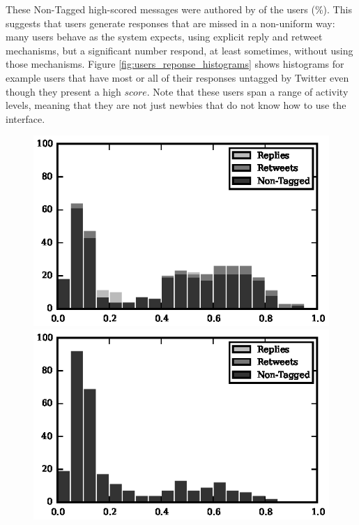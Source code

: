 These Non-Tagged high-scored messages were authored by \highUserCount{} of the \totalUsers{} users (\highUserCountPct{}\%). This suggests that users generate responses that are missed in a non-uniform way: many users behave as the system expects, using explicit reply and retweet mechanisms, but a significant number respond, at least sometimes, without using those mechanisms. 
Figure \ref{fig:users_reponse_histograms} shows histograms for example users that have most or all of their responses untagged by Twitter even though they present a high $score$.  Note that these users span a range of activity levels, meaning that they are not just newbies that do not know how to use the interface.

\begin{figure}[!tb]
\centering
\includegraphics[scale=0.9]{./figures/213501392_histogram.eps}
\includegraphics[scale=0.9]{./figures/808181892_histogram.eps}

\end{figure}
